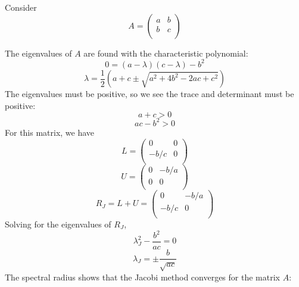 \documentclass[11pt]{article} %
\begin{document}
Consider
\begin{equation}
A = \left ( \begin{array}{rr}
a &b \\
b & c \\
\end{array} \right )
\end{equation}

The eigenvalues of $A$ are found with the characteristic polynomial:
\begin{equation}
	0 = (a- \lambda)(c-\lambda) - b^2
\end{equation}
\begin{equation}
\lambda = \frac{1}{2} \left ( a + c \pm \sqrt{a^2 +4b^2 - 2ac +c^2}\right )
\end{equation}
The eigenvalues must be positive, so we see the trace and determinant must be positive:
\begin{equation}
a +c > 0
\end{equation}
\begin{equation}
ac -b^2  > 0
\end{equation}
For this matrix, we have
\begin{equation}
L =  \left ( \begin{array}{rr}
0 &0 \\
-b/c & 0 \\
\end{array} \right )
\end{equation}
\begin{equation}
U =  \left ( \begin{array}{rr}
0 &-b/a\\
0 & 0 \\
\end{array} \right )
\end{equation}
\begin{equation}
R_J= L +U  = \left ( \begin{array}{rr}
0 &-b/a \\
-b/c & 0 \\
\end{array} \right )
\end{equation}
Solving for the eigenvalues of $R_J$,
\begin{equation}
\lambda_J^2 -\frac{ b^2}{ac} = 0
\end{equation}
\begin{equation}
\lambda_J = \pm \frac{b}{\sqrt{ac}}
\end{equation}
The spectral radius shows that the Jacobi method converges for the matrix $A$:
\end{document}
